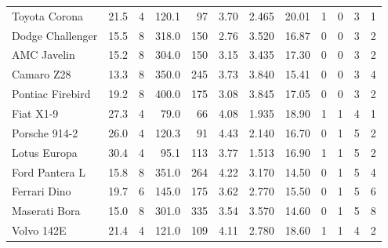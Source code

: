 \documentclass[aoas]{imsart}
\numberwithin{equation}{section}
\theoremstyle{plain}
\theoremstyle{remark}
\begin{document}
\begin{table}
\begin{tabular}[t]{lrrrrrrrrrrr}
Toyota Corona & 21.5 & 4 & 120.1 & 97 & 3.70 & 2.465 & 20.01 & 1 & 0 & 3 & 1\\
Dodge Challenger & 15.5 & 8 & 318.0 & 150 & 2.76 & 3.520 & 16.87 & 0 & 0 & 3 & 2\\
AMC Javelin & 15.2 & 8 & 304.0 & 150 & 3.15 & 3.435 & 17.30 & 0 & 0 & 3 & 2\\
Camaro Z28 & 13.3 & 8 & 350.0 & 245 & 3.73 & 3.840 & 15.41 & 0 & 0 & 3 & 4\\
Pontiac Firebird & 19.2 & 8 & 400.0 & 175 & 3.08 & 3.845 & 17.05 & 0 & 0 & 3 & 2\\
Fiat X1-9 & 27.3 & 4 & 79.0 & 66 & 4.08 & 1.935 & 18.90 & 1 & 1 & 4 & 1\\
Porsche 914-2 & 26.0 & 4 & 120.3 & 91 & 4.43 & 2.140 & 16.70 & 0 & 1 & 5 & 2\\
Lotus Europa & 30.4 & 4 & 95.1 & 113 & 3.77 & 1.513 & 16.90 & 1 & 1 & 5 & 2\\
Ford Pantera L & 15.8 & 8 & 351.0 & 264 & 4.22 & 3.170 & 14.50 & 0 & 1 & 5 & 4\\
Ferrari Dino & 19.7 & 6 & 145.0 & 175 & 3.62 & 2.770 & 15.50 & 0 & 1 & 5 & 6\\
Maserati Bora & 15.0 & 8 & 301.0 & 335 & 3.54 & 3.570 & 14.60 & 0 & 1 & 5 & 8\\
Volvo 142E & 21.4 & 4 & 121.0 & 109 & 4.11 & 2.780 & 18.60 & 1 & 1 & 4 & 2\\
\hline
\end{tabular}
\end{table}
\end{document}
